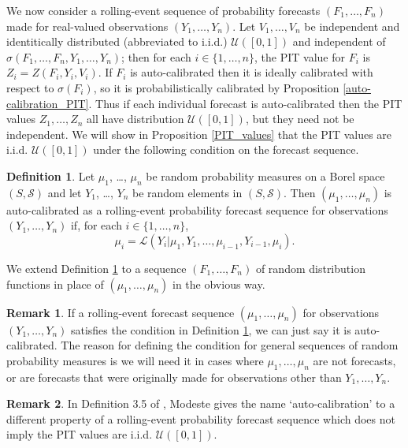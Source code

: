 \documentclass[aap]{imsart}
\theoremstyle{plain}
\theoremstyle{definition}
\newtheorem{definition}[theorem]{Definition}
\newtheorem*{remark}{Remark}
\begin{document}
We now consider a rolling-event sequence of probability forecasts $(F_1, \ldots, F_n)$ made for real-valued observations $(Y_1, \ldots, Y_n)$. Let $V_1, \ldots, V_n$ be independent and identitically distributed (abbreviated to i.i.d.) $\mathcal{U}([0,1])$ and independent of $\sigma(F_1, \ldots, F_n, Y_1, \ldots, Y_n)$; then for each $i \in \{1, \ldots, n\}$, the PIT value for $F_i$ is $Z_i = Z(F_i, Y_i, V_i)$. If $F_i$ is auto-calibrated then it is ideally calibrated with respect to $\sigma(F_i)$, so it is probabilistically calibrated by Proposition \ref{auto-calibration_PIT}. Thus if each individual forecast is auto-calibrated then the PIT values $Z_1, \ldots, Z_n$ all have distribution $\mathcal{U}([0,1])$, but they need not be independent. We will show in Proposition \ref{PIT_values} that the PIT values are i.i.d. $\mathcal{U}([0,1])$ under the following condition on the forecast sequence.
\begin{definition}\label{rolling_auto-calibration}
  Let $\mu_1$, \ldots, $\mu_n$ be random probability measures on a Borel space $(S,\mathcal{S})$ and let $Y_1$, \ldots, $Y_n$ be random elements in $(S,\mathcal{S})$. Then $(\mu_1, \ldots, \mu_n)$ is auto-calibrated as a rolling-event probability forecast sequence for observations $(Y_1, \ldots, Y_n)$ if, for each $i \in \{1,\ldots,n\}$,
  \begin{equation*}
    \mu_i = \mathcal{L}(Y_i|\mu_1, Y_1, \ldots, \mu_{i-1}, Y_{i-1}, \mu_i).
  \end{equation*}
\end{definition}
We extend Definition \ref{rolling_auto-calibration} to a sequence $(F_1, \ldots, F_n)$ of random distribution functions in place of $(\mu_1, \ldots, \mu_n)$ in the obvious way.

\begin{remark}
If a rolling-event forecast sequence $(\mu_1, \ldots, \mu_n)$ for observations $(Y_1, \ldots, Y_n)$ satisfies the condition in Definition \ref{rolling_auto-calibration}, we can just say it is auto-calibrated. The reason for defining the condition for general sequences of random probability measures is we will need it in cases where $\mu_1, \ldots, \mu_n$ are not forecasts, or are forecasts that were originally made for observations other than $Y_1, \ldots, Y_n$.
\end{remark}

\begin{remark}
In Definition 3.5 of \cite{Mds23}, Modeste gives the name `auto-calibration' to a different property of a rolling-event probability forecast sequence which does not imply the PIT values are i.i.d. $\mathcal{U}([0,1])$.
\end{remark}
\end{document}
